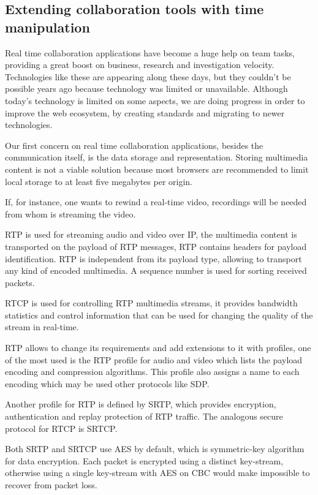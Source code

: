 \subsection{Extending collaboration tools with time manipulation}

Real time collaboration applications have become a huge help on team tasks, providing a great boost on business, research and investigation velocity. Technologies like these are appearing along these days, but they couldn't be possible years ago because technology was limited or unavailable. Although today's technology is limited on some aspects, we are doing progress in order to improve the web ecosystem, by creating standards and migrating to newer technologies.

 Our first concern on real time collaboration applications, besides the communication itself, is the data storage and representation. Storing multimedia content is not a viable solution because most browsers are recommended to limit local storage to at least five megabytes per origin.

	If, for instance, one wants to rewind a real-time video, recordings will be needed from whom is streaming the video. 

  \ac{RTP}\cite{rfc3550} is used for streaming audio and video over \ac{IP}, the multimedia content is transported on the payload of \ac{RTP} messages, \ac{RTP} contains headers for payload identification. \ac{RTP} is independent from its payload type, allowing to transport any kind of encoded multimedia. A sequence number is used for sorting received packets.

\ac{RTCP} is used for controlling \ac{RTP} multimedia streams, it provides bandwidth statistics and control information that can be used for changing the quality of the stream in real-time.

  \ac{RTP} allows to change its requirements and add extensions to it with profiles, one of the most used is the \ac{RTP} profile for audio and video \cite{rfc3551} which lists the payload encoding and compression algorithms. This profile also assigns a name to each encoding which may be used other protocols like \ac{SDP}.

  Another profile for \ac{RTP} is defined by \ac{SRTP}, which provides encryption, authentication and replay protection of \ac {RTP} traffic. The analogous secure protocol for \ac{RTCP} is \ac{SRTCP}.

  Both \ac{SRTP} and \ac{SRTCP} use \ac{AES} by default, which is symmetric-key algorithm for data encryption. Each packet is encrypted using a distinct key-stream, otherwise using a single key-stream with \ac{AES} on \ac{CBC} would make impossible to recover from packet loss.

